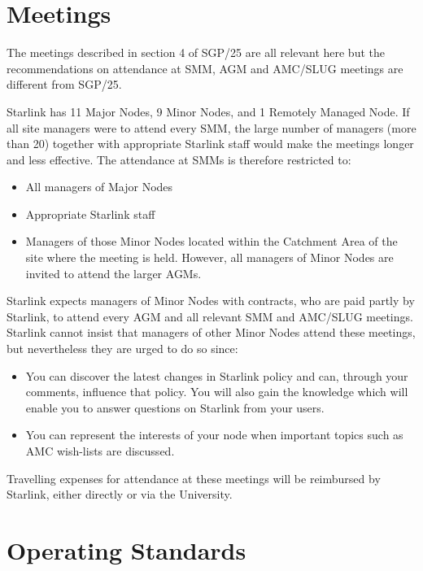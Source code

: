 \section {Meetings}

The meetings described in section 4 of SGP/25 are all relevant here but the
recommendations on attendance at SMM, AGM and AMC/SLUG meetings are different
from SGP/25.

Starlink has 11 Major Nodes, 9 Minor Nodes, and 1 Remotely Managed Node.
If all site managers were to attend every SMM, the large number of managers
(more than 20) together with appropriate Starlink staff would make the meetings
longer and less effective.
The attendance at SMMs is therefore restricted to:
\begin{itemize}
\item All managers of Major Nodes
\item Appropriate Starlink staff
\item Managers of those Minor Nodes located within the Catchment Area of the
site where the meeting is held.
However, all managers of Minor Nodes are invited to attend the larger AGMs.
\end{itemize}

Starlink expects managers of Minor Nodes with contracts, who are paid partly
by Starlink, to attend every AGM and all relevant SMM and AMC/SLUG meetings.
Starlink cannot insist that managers of other Minor Nodes attend these meetings,
but nevertheless they are urged to do so since:
\begin{itemize}
\item You can discover the latest changes in Starlink policy and can, through
your comments, influence that policy.
You will also gain the knowledge which will enable you to answer questions on
Starlink from your users.
\item You can represent the interests of your node when important topics
such as AMC wish-lists are discussed.
\end{itemize}
Travelling expenses for attendance at these meetings will be reimbursed by
Starlink, either directly or via the University.

\section {Operating Standards}

